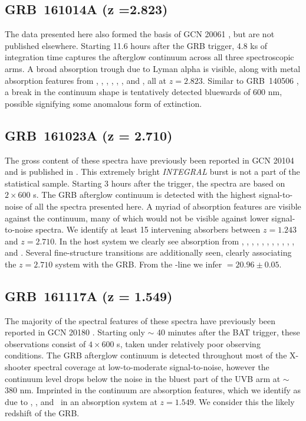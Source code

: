 \documentclass[longauth]{aa}    %
\begin{document}
\subsection{GRB~161014A (z =2.823)} \label{161014}

The data presented here also formed the basis of GCN  20061 \citep{GCN20061},
but are not published elsewhere. Starting 11.6 hours after the GRB trigger, 4.8
ks of integration time captures the afterglow continuum across all three
spectroscopic arms. A broad absorption trough due to Lyman alpha is visible,
along with metal absorption features from \mgii, \SIii, \cii, \civ, \alii,
\aliii, and	\feii, all at $z =2.823$. Similar to GRB~140506 \citep{Fynbo2014,
	Heintz2017b}, a break in the continuum shape is tentatively detected bluewards
of 600 nm, possible signifying some anomalous form of extinction.


\subsection{GRB~161023A (z = 2.710)}\label{161023}

The gross content of these spectra have previously been reported in GCN 20104
\citep{GCN20104} and is published in \citet{2018A&A...620A.119D}. This extremely
bright \textit{INTEGRAL} burst is not a part of the statistical sample. Starting
3 hours after the trigger, the spectra are based on $2 \times 600$ s. The GRB
afterglow continuum is detected with the highest signal-to-noise of all the
spectra presented here. A myriad of absorption features are visible against the
continuum, many of which would not be visible against lower signal-to-noise
spectra. We identify at least 15 intervening absorbers between $z = 1.243$ and
$z = 2.710$. In the host system we clearly see absorption from \lyb, \lya, \sii,
\SIii, \oi, \SIiv, \civ, \alii, \aliii, \feii, \mgii, and \mgi. Several
fine-structure transitions are additionally seen, clearly associating the $z =
2.710$ system with the GRB. From the \lya-line we infer \nh$=20.96 \pm 0.05$.

\subsection{GRB~161117A (z = 1.549)}\label{161117}

The majority of the spectral features of these spectra have previously been
reported in GCN 20180 \citep{GCN20180}. Starting only $\sim$ 40 minutes after
the BAT trigger, these observations consist of $4 \times 600$ s, taken under
relatively poor observing conditions. The GRB afterglow continuum is detected
throughout most of the X-shooter spectral coverage at low-to-moderate
signal-to-noise, however the continuum level drops below the noise in the bluest
part of the UVB arm at $\sim$ 380 nm. Imprinted in the continuum are
absorption features, which we identify as due to \feii, \mgii, and \mgi~in an
absorption system at $z = 1.549$. We consider this the likely redshift of the
GRB.
\end{document}

